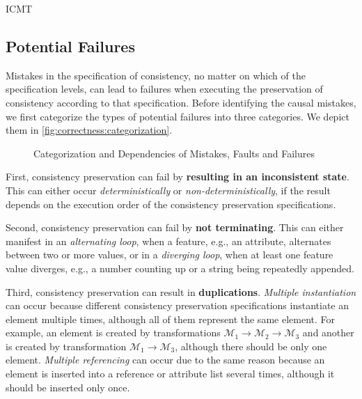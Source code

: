 \begin{copiedFrom}{ICMT}
\subsection{Potential Failures}
\label{chap:errors:failures}

Mistakes in the specification of consistency, no matter on which of the specification levels, %
can lead to failures when executing the preservation of consistency according to that specification. %
Before identifying the causal mistakes, we first categorize the types of potential failures into three categories. We depict them in \autoref{fig:correctness:categorization}.

\begin{figure}
    \centering
    
    \caption{Categorization and Dependencies of Mistakes, Faults and Failures}
    \label{fig:correctness:categorization}
\end{figure}

First, consistency preservation can fail by \textbf{resulting in an inconsistent state}. This can either occur \emph{deterministically} or \emph{non-deterministically}, if the result depends on the execution order of the consistency preservation specifications.

Second, consistency preservation can fail by \textbf{not terminating}. This can either manifest in an \emph{alternating loop}, when a feature, e.g., an attribute, alternates between two or more values, or in a \emph{diverging loop}, when at least one feature value diverges, e.g., a number counting up or a string being repeatedly appended.

Third, consistency preservation can result in \textbf{duplications}. \emph{Multiple instantiation} can occur because different consistency preservation specifications instantiate an element multiple times, although all of them represent the same element. %
For example, an element is created by transformations $\mathcal{M}_1 \rightarrow \mathcal{M}_2 \rightarrow \mathcal{M}_3$ and another is created by transformation $\mathcal{M}_1 \rightarrow \mathcal{M}_3$, although there should be only one element.
\emph{Multiple referencing} can occur due to the same reason because an element is inserted into a reference or attribute list several times, although it should be inserted only once. 




\end{copiedFrom}
